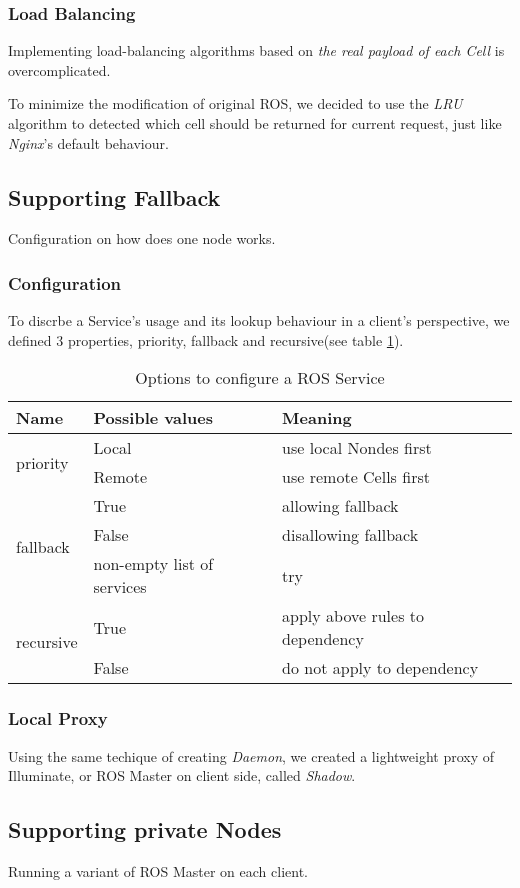 \subsubsection{Load Balancing}
Implementing load-balancing algorithms based on \emph{the real payload of each Cell} is overcomplicated.

To minimize the modification of original ROS, we decided to use the \emph{LRU} algorithm to detected which cell should be returned for current request, just like \emph{Nginx}'s default behaviour.

\subsection{Supporting Fallback}
Configuration on how does one node works. 

\subsubsection{Configuration}
To discrbe a Service's usage and its lookup behaviour in a client's perspective, we defined 3 properties, priority, fallback and recursive(see table \ref{table:srv-opt}).

\begin{table}
    \renewcommand{\arraystretch}{1.3}
    \caption{Options to configure a ROS Service}
    \label{table:srv-opt}
    \centering
    \begin{tabular}{|l|l|l|}
        \hline
        \bfseries Name & \bfseries Possible values & \bfseries Meaning \\
        \hline
        \multirow{2}{*}{priority}  & Local  & use local Nondes first \\
        \cline{2-3}
                                   & Remote & use remote Cells first \\
        \hline
        \multirow{3}{*}{fallback}  & True   & allowing fallback \\
        \cline{2-3}
                                   & False  & disallowing fallback \\
        \cline{2-3}
                                   & non-empty list of services & try  \\
        \hline
        \multirow{2}{*}{recursive} & True   & apply above rules to dependency \\
        \cline{2-3}
                                   & False  & do not apply to dependency \\
        \hline
    \end{tabular}
\end{table} 

\subsubsection{Local Proxy}
Using the same techique of creating \emph{Daemon}, we created a lightweight proxy of Illuminate, or ROS Master on client side, called \emph{Shadow}.

\subsection{Supporting private Nodes}
Running a variant of ROS Master on each client.


